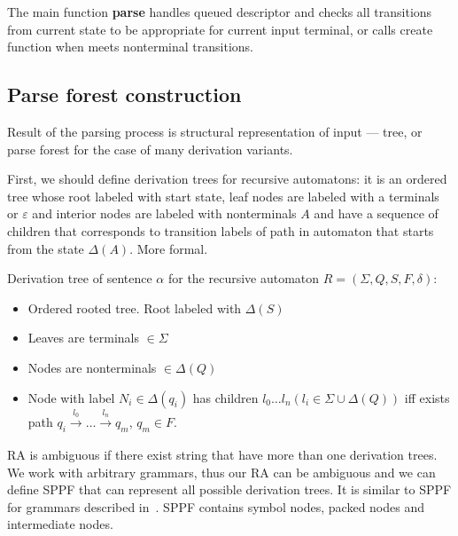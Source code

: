 \documentclass[runningheads,a4paper]{llncs}
\begin{document}


The main function \textbf{parse} handles queued descriptor and checks all transitions from current state to be appropriate
for current input terminal, or calls create function when meets nonterminal transitions.


\subsection{Parse forest construction}

Result of the parsing process is structural representation of input --- tree, or parse forest for the case of many derivation variants.

First, we should define derivation trees for recursive automatons: it is an ordered tree whose root labeled with start state,
leaf nodes are labeled with a terminals or $\varepsilon$ and interior nodes are labeled with 
nonterminals $A$ and have a sequence of children that corresponds to transition labels of path in 
automaton that starts from the state $\Delta(A)$. More formal. 

\begin{mydef}

Derivation tree of sentence $\alpha$ for the recursive automaton $R=(\Sigma, Q, S, F, \delta)$:%

\begin{itemize}
\item Ordered rooted tree. Root labeled with $\Delta(S)$
\item Leaves are terminals $\in \Sigma$
\item Nodes are nonterminals $\in \Delta(Q)$
\item Node with label $N_i \in \Delta(q_i)$ has children $l_0 \dots l_n (l_i \in \Sigma \cup \Delta(Q))$ iff exists
path
$q_i \xrightarrow[]{l_0} \dots \xrightarrow{l_n} q_m$, $q_m \in F$. 
\end{itemize}

\end{mydef}

RA is ambiguous if there exist string that have more than one derivation trees. 
We work with arbitrary grammars, thus our RA can be ambiguous and we can define SPPF that can represent all possible derivation trees.
It is similar to SPPF for grammars described in~\cite{scott2013gll}. SPPF contains symbol nodes, packed nodes
and intermediate nodes. 
\end{document}
